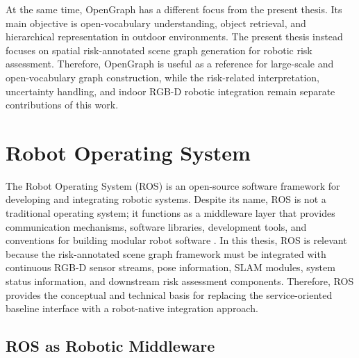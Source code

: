 {At the same time, OpenGraph has a different focus from the present thesis. Its main objective is open-vocabulary understanding, object retrieval, and hierarchical representation in outdoor environments. The present thesis instead focuses on spatial risk-annotated scene graph generation for robotic risk assessment. Therefore, OpenGraph is useful as a reference for large-scale and open-vocabulary graph construction, while the risk-related interpretation, uncertainty handling, and indoor RGB-D robotic integration remain separate contributions of this work.

}


















\section{Robot Operating System}

{\small

The Robot Operating System (ROS) is an open-source software framework for developing and integrating robotic systems. Despite its name, ROS is not a traditional operating system; it functions as a middleware layer that provides communication mechanisms, software libraries, development tools, and conventions for building modular robot software \cite{quigley2009ros}. In this thesis, ROS is relevant because the risk-annotated scene graph framework must be integrated with continuous RGB-D sensor streams, pose information, SLAM modules, system status information, and downstream risk assessment components. Therefore, ROS provides the conceptual and technical basis for replacing the service-oriented baseline interface with a robot-native integration approach.

}

\subsection{ROS as Robotic Middleware}

